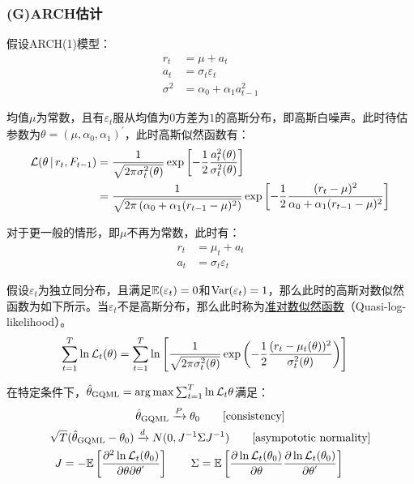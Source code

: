 \documentclass[11pt]{article}
\begin{document}
\subsubsection{(G)ARCH估计}

假设ARCH(1)模型：
\begin{align*}
    r_t &= \mu + a_t \\
    a_t &= \sigma_t \varepsilon_t \\
    \sigma^2 &= \alpha_0 + \alpha_1 a_{t-1}^{2}
\end{align*}

均值$\mu$为常数，且有$\varepsilon_t$服从均值为$0$方差为$1$的高斯分布，即高斯白噪声。此时待估参数为$\theta = (\mu,\alpha_0,\alpha_1)^{'}$，此时高斯似然函数有：
\begin{align*}
    \mathcal{L}( \theta \,\vert\, r_t,F_{t-1})
    &= \frac{1}{\sqrt{2\pi\sigma_{t}^{2}(\theta)}} \exp \left[ -\frac{1}{2} \frac{a_{t}^{2}(\theta)}{\sigma_{t}^{2}(\theta)} \right] \\
    &= \frac{1}{\sqrt{2\pi\left(\alpha_0 + \alpha_1(r_{t-1}-\mu)^2\right)}} \exp \left[ -\frac{1}{2} \frac{(r_t - \mu)^2}{\alpha_0 + \alpha_1(r_{t-1}-\mu)^2} \right]
\end{align*}

对于更一般的情形，即$\mu$不再为常数，此时有：
\begin{align*}
    r_t &= \mu_t + a_t \\
    a_t &= \sigma_t \varepsilon_t
\end{align*}

假设$\varepsilon_t$为独立同分布，且满足$\mathbb{E}(\varepsilon_t)=0$和$\operatorname{Var}(\varepsilon_t)=1$，那么此时的高斯对数似然函数为如下所示。当$\varepsilon_t$不是高斯分布，那么此时称为\uline{准对数似然函数}（Quasi-log-likelihood）。
\begin{align*}
    \sum_{t=1}^{T} \ln \mathcal{L}_t(\theta)
    &= \sum_{t=1}^{T} \ln \left[ \frac{1}{\sqrt{2\pi\sigma_{t}^{2}(\theta)}} \exp \left( -\frac{1}{2} \frac{(r_t - \mu_t(\theta))^2}{\sigma_{t}^{2}(\theta)} \right) \right]
\end{align*}

在特定条件下，$\hat{\theta}_{\text{GQML}} = \arg \max \sum_{t=1}^{T} \ln \mathcal{L}_t{\theta}$满足：
\begin{gather*}
    \hat{\theta}_{\text{GQML}} \xrightarrow{P} \theta_0 \qquad \text{[consistency]}\\
    \sqrt{T}(\hat{\theta}_{\text{GQML}}-\theta_0) \xrightarrow{d} N(0,J^{-1}\Sigma J^{-1}) \qquad\text{[asympototic normality]} \\
    J = -\mathbb{E}\left[ \frac{\partial^2 \ln \mathcal{L}_t(\theta_0)}{\partial \theta \partial \theta^{'}} \right] \qquad
    \Sigma = \mathbb{E}\left[ \frac{\partial \ln \mathcal{L}_t(\theta_0)}{\partial \theta} \frac{\partial \ln \mathcal{L}_t(\theta_0)}{\partial \theta^{'}} \right] \qquad
\end{gather*}
\end{document}
